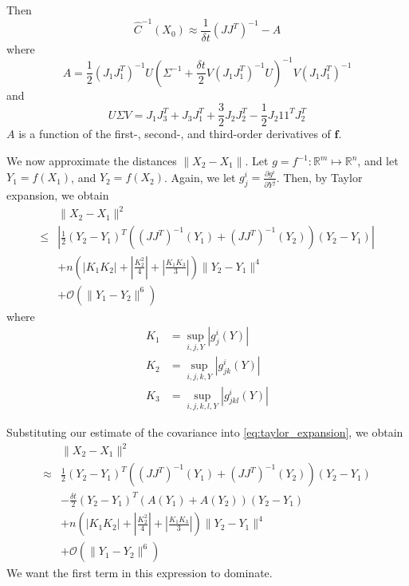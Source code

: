 \documentclass[1p]{elsarticle}
\begin{document}
Then
\begin{equation}
\hat{C}^{-1}(X_0) \approx \frac{1}{\delta t} \left( J J^T \right)^{-1} - A
\end{equation}
%
where 
\begin{equation}
A = \frac{1}{2} (J_1 J_1^T)^{-1} U \left(\Sigma^{-1} + \frac{\delta t}{2} V \left( J_1 J_1^T \right)^{-1} U \right)^{-1} V \left( J_1 J_1^T \right)^{-1}
\end{equation}
and
\begin{equation}
U \Sigma V = J_1 J_3^T + J_3 J_1^T + \frac{3}{2} J_2 J_2^T -\frac{1 }{2} J_2 1 1^T J_2^T 
\end{equation}
$A$ is a function of the first-, second-, and third-order derivatives of $\mathbf{f}$.


We now approximate the distances $\| X_2 - X_1 \|$.
%
Let $g = f^{-1}: \mathbb{R}^m \mapsto \mathbb{R}^n$, and let $Y_1 = f(X_1)$, and $Y_2 = f(X_2)$.
%
Again, we let $g_j^i = \frac{\partial g^i}{\partial Y^j}$.
%
Then, by Taylor expansion, we obtain
\begin{equation} \label{eq:taylor_expansion}
\begin{aligned}
&\| X_2 - X_1 \|^2 \\
\le&  \left| \frac{1}{2} (Y_2 - Y_1 )^T ((J J^T)^{-1} (Y_1) + (J J^T)^{-1}(Y_2)) (Y_2 - Y_1 ) \right| \\
& + n \left( \left| K_1 K_2 \right| + \left| \frac{ K_2^2}{4} \right|  + \left| \frac{K_1 K_3}{3} \right|  \right) \| Y_2 - Y_1 \| ^4  \\
& + \mathcal{O} (\|Y_1 - Y_2 \|^6 ) 
\end{aligned}
\end{equation}
%
where
%
\begin{equation}
\begin{aligned}
K_1 &= \sup_{i,j,Y} |g_j^i(Y)|\\
K_2 &= \sup_{i,j,k,Y} |g_{jk}^i(Y)|\\
K_3 &= \sup_{i,j,k,l,Y} |g_{jkl}^i(Y)|
\end{aligned}
\end{equation}

Substituting our estimate of the covariance into \eqref{eq:taylor_expansion}, we obtain
\begin{equation}
\begin{aligned}
&\| X_2 - X_1 \|^2 \\
\approx &  \frac{1}{2} (Y_2 - Y_1)^T \left((J J^T)^{-1}(Y_1)  + (J J^T)^{-1}(Y_2) \right) (Y_2 - Y_1) \\
& - \frac{\delta t}{2} (Y_2 - Y_1)^T \left( A(Y_1) + A(Y_2) \right) (Y_2 - Y_1)\\
& + n \left( \left| K_1 K_2 \right| + \left| \frac{ K_2^2}{4} \right|  + \left| \frac{K_1 K_3}{3} \right|  \right) \| Y_2 - Y_1 \| ^4  \\
& + \mathcal{O} (\|Y_1 - Y_2 \|^6 ) 
\end{aligned}
\end{equation}
%
We want the first term in this expression to dominate.
\end{document}
